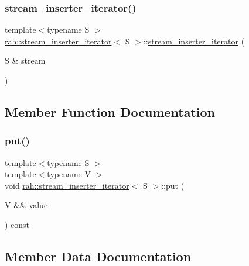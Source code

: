 \subsubsection{\texorpdfstring{stream\_inserter\_iterator()}{stream\_inserter\_iterator()}}
{\footnotesize\ttfamily template$<$typename S $>$ \\
\mbox{\hyperlink{structrah_1_1stream__inserter__iterator}{rah\+::stream\+\_\+inserter\+\_\+iterator}}$<$ S $>$\+::\mbox{\hyperlink{structrah_1_1stream__inserter__iterator}{stream\+\_\+inserter\+\_\+iterator}} (\begin{DoxyParamCaption}\item[{S \&}]{stream }\end{DoxyParamCaption})\hspace{0.3cm}{\ttfamily [inline]}}



\subsection{Member Function Documentation}
\mbox{\label{structrah_1_1stream__inserter__iterator_a449c0bfdb9f253260430c0184ef370fe}} 
\subsubsection{\texorpdfstring{put()}{put()}}
{\footnotesize\ttfamily template$<$typename S $>$ \\
template$<$typename V $>$ \\
void \mbox{\hyperlink{structrah_1_1stream__inserter__iterator}{rah\+::stream\+\_\+inserter\+\_\+iterator}}$<$ S $>$\+::put (\begin{DoxyParamCaption}\item[{V \&\&}]{value }\end{DoxyParamCaption}) const\hspace{0.3cm}{\ttfamily [inline]}}



\subsection{Member Data Documentation}
\mbox{\label{structrah_1_1stream__inserter__iterator_aa5b590a04a36ca43ba67adf772418897}} 
